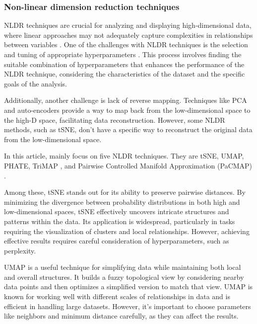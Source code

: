 \documentclass[
  12pt]{article}
\begin{document}
\hypertarget{non-linear-dimension-reduction-techniques}{%
\subsubsection{Non-linear dimension reduction
techniques}\label{non-linear-dimension-reduction-techniques}}

NLDR techniques are crucial for analyzing and displaying
high-dimensional data, where linear approaches may not adequately
capture complexities in relationships between variables
\citep{Johnstone2009}. One of the challenges with NLDR techniques is the
selection and tuning of appropriate hyperparameters \citep{liao2023}.
This process involves finding the suitable combination of
hyperparameters that enhances the performance of the NLDR technique,
considering the characteristics of the dataset and the specific goals of
the analysis.

Additionally, another challenge is lack of reverse mapping. Techniques
like PCA and auto-encoders \citep{article65} provide a way to map back
from the low-dimensional space to the high-D space, facilitating data
reconstruction. However, some NLDR methods, such as tSNE, don't have a
specific way to reconstruct the original data from the low-dimensional
space.

In this article, mainly focus on five NLDR techniques. They are tSNE,
UMAP, PHATE, TriMAP \citep{article02}, and Pairwise Controlled Manifold
Approximation (PaCMAP) \citep{Yingfan2021}.

Among these, tSNE \citep{Laurens2008} stands out for its ability to
preserve pairwise distances. By minimizing the divergence between
probability distributions in both high and low-dimensional spaces, tSNE
effectively uncovers intricate structures and patterns within the data.
Its application is widespread, particularly in tasks requiring the
visualization of clusters and local relationships. However, achieving
effective results requires careful consideration of hyperparameters,
such as perplexity.

UMAP \citep{Leland2018} is a useful technique for simplifying data while
maintaining both local and overall structures. It builds a fuzzy
topological view by considering nearby data points and then optimizes a
simplified version to match that view. UMAP is known for working well
with different scales of relationships in data and is efficient in
handling large datasets. However, it's important to choose parameters
like neighbors and minimum distance carefully, as they can affect the
results.
\end{document}

